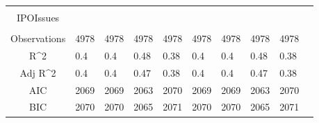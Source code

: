 \documentclass{article}
\begin{document}
\begin{table}[H]
\begin{tabular}{|clllllllll|}
   &  &  &  &  &  &  &  &  & \\ 
  IPOIssues &  &  &  &  &  &  &  &  & \\ 
   &  &  &  &  &  &  &  &  & \\ 
  \hline 
 Observations & 4978 & 4978 & 4978 & 4978 & 4978 & 4978 & 4978 & 4978 & \\ 
  R^2 & 0.4 & 0.4 & 0.48 & 0.38 & 0.4 & 0.4 & 0.48 & 0.38 & \\ 
  Adj R^2 & 0.4 & 0.4 & 0.47 & 0.38 & 0.4 & 0.4 & 0.47 & 0.38 & \\ 
  AIC & 2069 & 2069 & 2063 & 2070 & 2069 & 2069 & 2063 & 2070 & \\ 
  BIC & 2070 & 2070 & 2065 & 2071 & 2070 & 2070 & 2065 & 2071 & \\ 
   \hline
\end{tabular}
 
\end{table}
\end{document}
